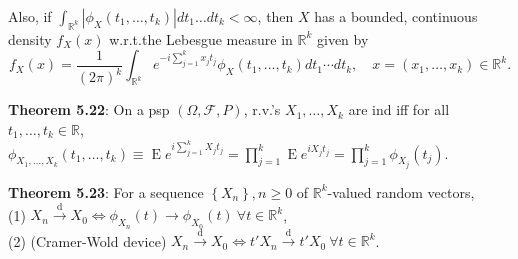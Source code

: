 \documentclass[paper=letter,fontsize=2.89mm]{scrartcl}
\DeclareMathOperator{\E}{E}
\newcommand{\convdist}{\stackrel{\text{d}}{\longrightarrow}}
\newcommand{\R}{\mathbb{R}}
\newcommand\abs[1]{\left| #1 \right|}
\newcommand\set[1]{\left\{ #1 \right\}}
\begin{document}
\begin{multicols*}{3}
Also, if $\int_{\R^k} \abs{\phi_X(t_1,\dots,t_k)}dt_1\dots dt_k < \infty$, then $X$ has a bounded, continuous density $f_X(x)$ w.r.t.\@ the Lebesgue measure in $\R^k$ given by
$$f_X(x) = \frac{1}{(2\pi)^k} \int_{\R^k} e^{-i\sum_{j=1}^k x_jt_j}\phi_X(t_1, \dots, t_k)dt_1 \cdots dt_k, \quad x = (x_1, \dots, x_k) \in \R^k.$$

\textbf{Theorem 5.22}: On a psp $(\Omega, \mathcal{F}, P)$, r.v.'s $X_1, \dots, X_k$ are ind iff for all $t_1, \dots, t_k \in \R$,
$\phi_{X_1, \dots, X_k}(t_1, \dots, t_k) \equiv \E e^{i\sum_{j=1}^k X_j t_j} =
\prod_{j=1}^k \E e^{iX_j t_j} = \prod_{j=1}^k \phi_{X_j}(t_j).$ \\ \medskip


\textbf{Theorem 5.23}: For a sequence $\set{X_n}, n \ge 0$ of $\R^k$-valued random vectors, \\
(1) $X_n \convdist X_0 \iff \phi_{X_n}(t) \to \phi_{X_0}(t) ~ \forall t \in \R^k$, \\
(2)  (Cramer-Wold device) $X_n \convdist X_0 \iff t'X_n \convdist t' X_0 ~ \forall t \in \R^k$.

\end{multicols*}
\end{document}
